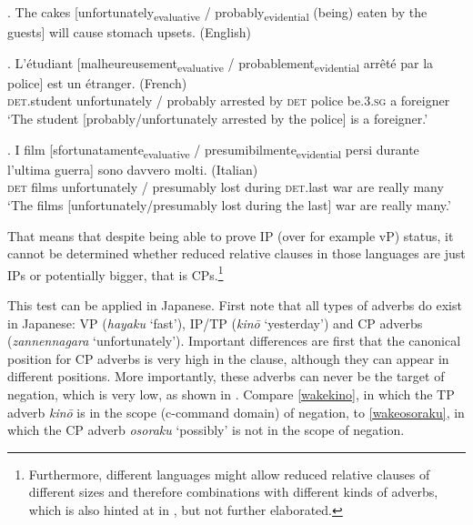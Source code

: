 \ex. The cakes [unfortunately\textsubscript{evaluative} / probably\textsubscript{evidential} (being) eaten by the guests] will cause stomach upsets. (English) \null \hfill \citep[226]{douglas:2016:syntactic}

\exg. L’étudiant [malheureusement\textsubscript{evaluative} / probablement\textsubscript{evidential} arrêté par la police] est un étranger. (French)\\
\textsc{det}.student unfortunately / probably arrested by \textsc{det} police be.\textsc{3.sg} a foreigner\\
`The student [probably/unfortunately arrested by the police] is a foreigner.’ \\ \null \hfill \citep[241]{douglas:2016:syntactic}

\exg. I film [sfortunatamente\textsubscript{evaluative} / presumibilmente\textsubscript{evidential} persi durante l’ultima guerra] sono davvero molti. (Italian)\\
\textsc{det} films unfortunately / presumably lost during \textsc{det}.last war are really many\\
`The films [unfortunately/presumably lost during the last] war are really many.’ \null \hfill \citep[214]{cinque:2020:relcl}

\newpage
That means that despite being able to prove IP (over for example vP) status, it cannot be determined whether reduced relative clauses in those languages are just IPs or potentially bigger, that is CPs.\footnote{Furthermore, different languages might allow reduced relative clauses of different sizes and therefore combinations with different kinds of adverbs, which is also hinted at in \citet[76–77]{krause:2001:rrc}, but not further elaborated.}

This test can be applied in Japanese. First note that all types of adverbs do exist in Japanese: VP (\textit{hayaku} `fast'), IP/TP (\textit{kinō} `yesterday') and CP adverbs (\textit{zannennagara} `unfortunately’). Important differences are first that the canonical position for CP adverbs is very high in the clause, although they can appear in different positions. More importantly, these adverbs can never be the target of negation, which is very low, as shown in \citet{koizumi:2017:subject}. Compare \ref{wakekino}, in which the TP adverb \textit{kinō} is in the scope (c-command domain) of negation, to \ref{wakeosoraku}, in which the CP adverb \textit{osoraku} `possibly’ is not in the scope of negation.

